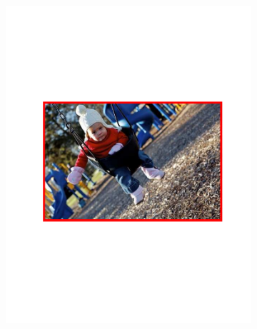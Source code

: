 \begin{figure}[hbt]
    \centering
    \begin{subfigure}[b]{0.45\textwidth}
        \centering
        \includegraphics[width=\textwidth]{FP1}
        \caption{}
        \label{fig:detfp1}
    \end{subfigure}
    ~
    \begin{subfigure}[b]{0.45\textwidth}
        \centering

\end{subfigure}
\end{figure}

